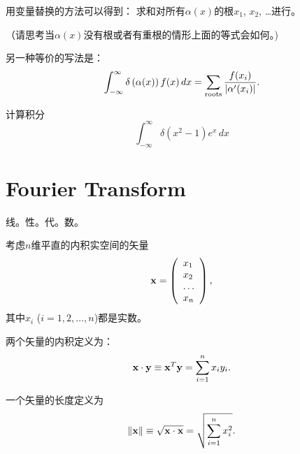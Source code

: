 \documentclass[CJK]{beamer}
\begin{document}
\begin{frame}
  \bch
  用变量替换的方法可以得到：
  求和对所有$\alpha(x)$的根$x_1$, $x_2$, \ldots 进行。

   {\scriptsize （请思考当$\alpha(x)$没有根或者有重根的情形上面的等式会如何。)}

  \skiplines
  
 {\small 另一种等价的写法是：
  $$\int_{-\infty}^\infty \delta\left(\alpha(x)\right) f(x) \,dx = \sum_{\rm roots} \frac{f(x_i)}{|\alpha'(x_i)|}.$$}
  
  \ech
\end{frame}


\begin{frame}
  \bch
  
  计算积分
  $$\int_{-\infty}^\infty \delta(x^2-1) e^x\, dx$$
  \ech
\end{frame}



\section{Fourier Transform}


\begin{frame}
  \bch
  \bcenter

  线。性。代。数。
  \ecenter
  \ech
\end{frame}
  

\begin{frame}
  \bch
  考虑$n$维平直的内积实空间的矢量
  $${\mathbf{x}} = \left(\begin{array}{l}x_1 \\ x_2 \\ \ldots \\ x_n \end{array}\right),$$
  其中$x_i$ ($i=1,2,\ldots, n$)都是实数。

  \skipline
  
  两个矢量的内积定义为：
  $$ {\mathbf{x}} \cdot {\mathbf{y}} \equiv  {\mathbf{x}}^T {\mathbf{y}} = \sum_{i=1}^n x_iy_i.$$

  \skipline
  
  一个矢量的长度定义为
  $$\left\Vert{\mathbf{x}}\right\Vert \equiv \sqrt{{\mathbf{x}}\cdot{\mathbf{x}}}= \sqrt{\sum_{i=1}^n x_i^2}. $$

  
  \ech
\end{frame}
\end{document}
